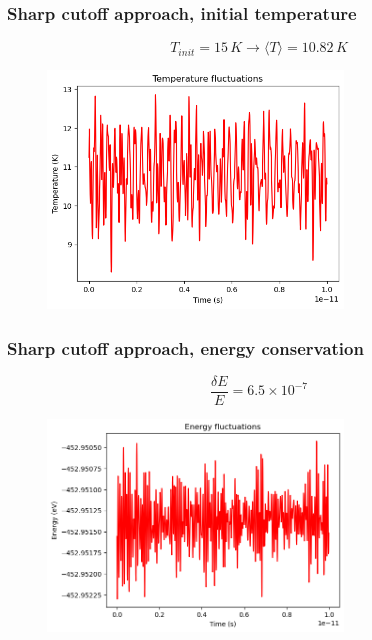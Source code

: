 \documentclass{beamer}
\begin{document}
\begin{frame}
    \frametitle{Sharp cutoff approach, initial temperature}

    $$T_{init}=15\,K \rightarrow \langle T \rangle = 10.82\,K $$

    \begin{figure}
        \includegraphics[width=0.7\textwidth]{images/tempafter.png}
    \end{figure}

\end{frame}


\begin{frame}
    \frametitle{Sharp cutoff approach, energy conservation}

    $$\frac{\delta E }{E}=6.5\times 10^{-7}    $$

    \begin{figure}
        \includegraphics[width=0.7\textwidth]{images/energy1.png}
    \end{figure}

\end{frame}
\end{document}
